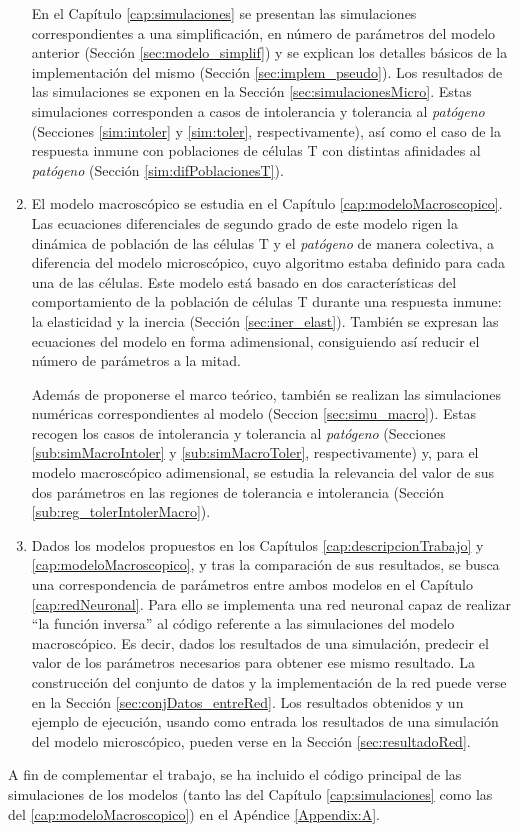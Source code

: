 \begin{enumerate}
	En el Capítulo \ref{cap:simulaciones} se presentan las simulaciones correspondientes a una simplificación, en número de parámetros del modelo anterior (Sección \ref{sec:modelo_simplif}) y se explican los detalles básicos de la implementación del mismo (Sección \ref{sec:implem_pseudo}). Los resultados de las simulaciones se exponen en la Sección \ref{sec:simulacionesMicro}. Estas simulaciones corresponden a casos de intolerancia y tolerancia al \textit{patógeno} (Secciones \ref{sim:intoler} y \ref{sim:toler}, respectivamente), así como el caso de la respuesta inmune con poblaciones de células T con distintas afinidades al \textit{patógeno} (Sección \ref{sim:difPoblacionesT}).
	
	
	\item El modelo macroscópico se estudia en el Capítulo \ref{cap:modeloMacroscopico}. Las ecuaciones diferenciales de segundo grado de este modelo rigen la dinámica de población de las células T y el \textit{patógeno} de manera colectiva, a diferencia del modelo microscópico, cuyo algoritmo estaba definido para cada una de las células. Este modelo está basado en dos características del comportamiento de la población de células T durante una respuesta inmune: la elasticidad y la inercia (Sección \ref{sec:iner_elast}). También se expresan las ecuaciones del modelo en forma adimensional, consiguiendo así reducir el número de parámetros a la mitad.
	
	Además de proponerse el marco teórico, también se realizan las simulaciones numéricas correspondientes al modelo (Seccion \ref{sec:simu_macro}). Estas recogen los casos de intolerancia y tolerancia al \textit{patógeno} (Secciones \ref{sub:simMacroIntoler} y \ref{sub:simMacroToler}, respectivamente) y, para el modelo macroscópico adimensional, se estudia la relevancia del valor de sus dos parámetros en las regiones de tolerancia e intolerancia (Sección \ref{sub:reg_tolerIntolerMacro}).
	
	\item Dados los modelos propuestos en los Capítulos \ref{cap:descripcionTrabajo} y \ref{cap:modeloMacroscopico}, y tras la comparación de sus resultados, se busca una correspondencia de parámetros entre ambos modelos en el Capítulo \ref{cap:redNeuronal}. Para ello se implementa una red neuronal capaz de realizar ``la función inversa'' al código referente a las simulaciones del modelo macroscópico. Es decir, dados los resultados de una simulación, predecir el valor de los parámetros necesarios para obtener ese mismo resultado. La construcción del conjunto de datos y la implementación de la red puede verse en la Sección \ref{sec:conjDatos_entreRed}. Los resultados obtenidos y un ejemplo de ejecución, usando como entrada los resultados de una simulación del modelo microscópico, pueden verse en la Sección \ref{sec:resultadoRed}.
	
\end{enumerate}

A fin de complementar el trabajo, se ha incluido el código principal de las simulaciones de los modelos (tanto las del Capítulo \ref{cap:simulaciones} como las del \ref{cap:modeloMacroscopico}) en el Apéndice \ref{Appendix:A}.






